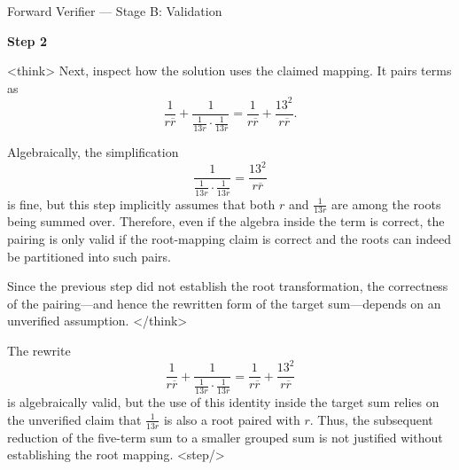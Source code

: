 \documentclass[11pt]{article}
\begin{document}
\begin{exbox}{Forward Verifier — Stage B: Validation}

\textbf{Step 2}

<think>
Next, inspect how the solution uses the claimed mapping. It pairs terms as
\[
\frac{1}{r\overline{r}} + \frac{1}{\frac{1}{13r}\cdot\frac{1}{13\overline{r}}}
= \frac{1}{r\overline{r}} + \frac{13^{2}}{r\overline{r}}.
\]

Algebraically, the simplification
\[
\frac{1}{\frac{1}{13r}\cdot\frac{1}{13\overline{r}}} = \frac{13^2}{r\overline{r}}
\]
is fine, but this step implicitly assumes that both \(r\) and \(\frac{1}{13r}\) are among the roots being summed over.
Therefore, even if the algebra inside the term is correct, the pairing is only valid if the root-mapping claim is correct and the roots can indeed be partitioned into such pairs.

Since the previous step did not establish the root transformation, the correctness of the pairing—and hence the rewritten form of the target sum—depends on an unverified assumption.
</think>

The rewrite
\[
\frac{1}{r\overline{r}} + \frac{1}{\frac{1}{13r}\cdot\frac{1}{13\overline{r}}}
= \frac{1}{r\overline{r}} + \frac{13^{2}}{r\overline{r}}
\]
is algebraically valid, but the use of this identity inside the target sum relies on the unverified claim that \(\frac{1}{13r}\) is also a root paired with \(r\). Thus, the subsequent reduction of the five-term sum to a smaller grouped sum is not justified without establishing the root mapping.
<step/>

\end{exbox}
\end{document}
